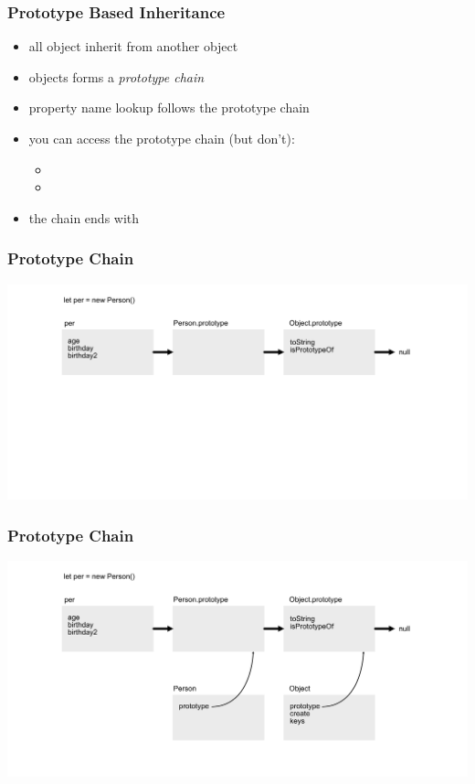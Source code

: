 \begin{frame}[fragile] \frametitle{Prototype Based Inheritance}

\begin{itemize}
  \item all object inherit from another object
  \item objects forms a \emph{prototype chain}
  \item property name lookup follows the prototype chain
  \item you can access the prototype chain (but don't):
  \begin{itemize}
    \item {}
    \item {}
  \end{itemize}
  \item the chain ends with 
\end{itemize}
\end{frame}

\begin{frame}[fragile]
\frametitle{Prototype Chain}
  \centering
  \includegraphics[width=14cm]{img/prototype_chain}

\end{frame}

\begin{frame}[fragile]
\frametitle{Prototype Chain}
  \centering
  \includegraphics[width=14cm]{img/prototype_chain2}
\end{frame}


